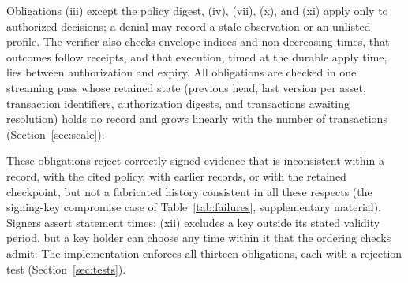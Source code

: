 Obligations (iii) except the policy digest, (iv), (vii), (x), and (xi) apply only to authorized decisions; a denial may record a stale observation or an unlisted profile. The verifier also checks envelope indices and non-decreasing times, that outcomes follow receipts, and that execution, timed at the durable apply time, lies between authorization and expiry. All obligations are checked in one streaming pass whose retained state (previous head, last version per asset, transaction identifiers, authorization digests, and transactions awaiting resolution) holds no record and grows linearly with the number of transactions (Section~\ref{sec:scale}).

These obligations reject correctly signed evidence that is inconsistent within a record, with the cited policy, with earlier records, or with the retained checkpoint, but not a fabricated history consistent in all these respects (the signing-key compromise case of Table~\ref{tab:failures}, supplementary material). Signers assert statement times: (xii) excludes a key outside its stated validity period, but a key holder can choose any time within it that the ordering checks admit. The implementation enforces all thirteen obligations, each with a rejection test (Section~\ref{sec:tests}).

